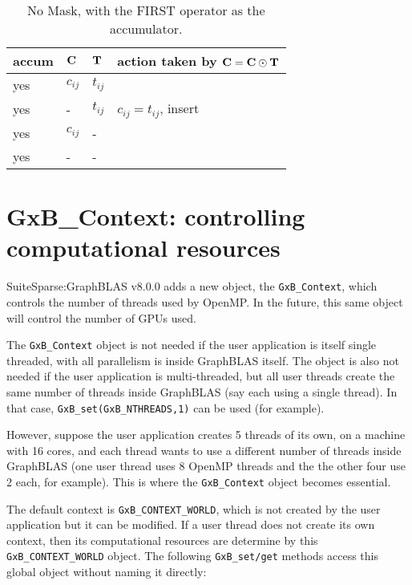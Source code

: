 \documentclass[12pt]{article}
\begin{document}
\begin{table}[h]
\begin{center}
{\small
\begin{tabular}{lll|l}
\hline
       accum & ${\bf C}$ & ${\bf T}$        & action taken by ${\bf C = C \odot T}$ \\
\hline
        yes & $c_{ij}$ & $t_{ij}$         &  \\
        yes &  -       & $t_{ij}$         &  $c_{ij} = t_{ij}$, insert \\
        yes & $c_{ij}$ &  -               &   \\
        yes &  -       &  -               &   \\
\hline
\end{tabular}
}
\caption{No Mask, with the FIRST operator as the accumulator.
\label{tab:maskaccum_nomask_1st}}
\end{center}
\end{table}

\newpage
\section{{\sf GxB\_Context:} controlling computational resources} %
\label{context}

SuiteSparse:GraphBLAS v8.0.0 adds a new object, the \verb'GxB_Context', which
controls the number of threads used by OpenMP.  In the future, this same object
will control the number of GPUs used.

The \verb'GxB_Context' object is not needed if the user application is itself
single threaded, with all parallelism is inside GraphBLAS itself.  The object
is also not needed if the user application is multi-threaded, but all user
threads create the same number of threads inside GraphBLAS (say each using a
single thread).  In that case, \verb'GxB_set(GxB_NTHREADS,1)' can be used (for
example).

However, suppose the user application creates 5 threads of its own, on a
machine with 16 cores, and each thread wants to use a different number of
threads inside GraphBLAS (one user thread uses 8 OpenMP threads and the
the other four use 2 each, for example).  This is where the \verb'GxB_Context'
object becomes essential.

The default context is \verb'GxB_CONTEXT_WORLD', which is not created by the
user application but it can be modified.  If a user thread does not create its
own context, then its computational resources are determine by this
\verb'GxB_CONTEXT_WORLD' object.  The following \verb'GxB_set/get' methods
access this global object without naming it directly:
\end{document}
